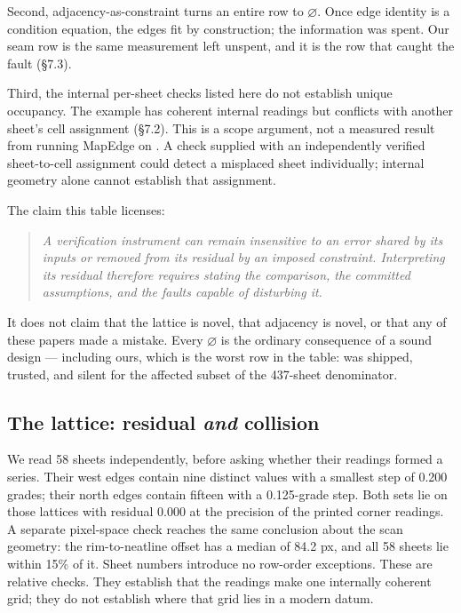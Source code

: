 \documentclass[11pt,a4paper]{article}
\begin{document}
Second, adjacency-as-constraint turns an entire row to \ensuremath{\varnothing}. Once edge identity is a condition equation, the edges fit by construction; the information was spent. Our seam row is the same measurement left unspent, and it is the row that caught the fault (§7.3).

Third, the internal per-sheet checks listed here do not establish unique occupancy. The \texttt{} example has coherent internal readings but conflicts with another sheet's cell assignment (§7.2). This is a scope argument, not a measured result from running MapEdge on \texttt{}. A check supplied with an independently verified sheet-to-cell assignment could detect a misplaced sheet individually; internal geometry alone cannot establish that assignment.

The claim this table licenses:

\begin{quote}\itshape
A verification instrument can remain insensitive to an error shared by its inputs or removed from its residual by an imposed constraint. Interpreting its residual therefore requires stating the comparison, the committed assumptions, and the faults capable of disturbing it.
\end{quote}

It does not claim that the lattice is novel, that adjacency is novel, or that any of these papers made a mistake. Every \ensuremath{\varnothing} is the ordinary consequence of a sound design — including ours, which is the worst row in the table: \texttt{} was shipped, trusted, and silent for the affected subset of the 437-sheet denominator.

\subsection{The lattice: residual \emph{and} collision}

We read 58 sheets independently, before asking whether their readings formed a series. Their west edges contain nine distinct values with a smallest step of 0.200 grades; their north edges contain fifteen with a 0.125-grade step. Both sets lie on those lattices with residual 0.000 at the precision of the printed corner readings. A separate pixel-space check reaches the same conclusion about the scan geometry: the rim-to-neatline offset has a median of 84.2 px, and all 58 sheets lie within 15\% of it. Sheet numbers introduce no row-order exceptions. These are relative checks. They establish that the readings make one internally coherent grid; they do not establish where that grid lies in a modern datum.
\end{document}
